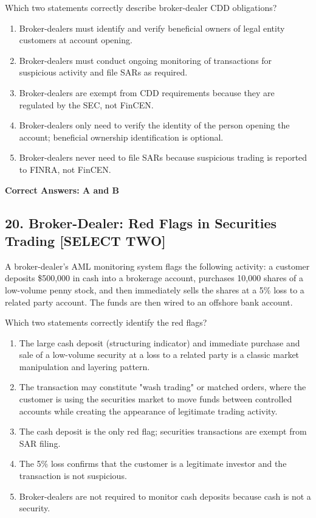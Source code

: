\documentclass[11pt,a4paper]{article}
\begin{document}
	Which two statements correctly describe broker-dealer CDD obligations?
	
	\begin{enumerate}[label=\Alph*.]
		\item Broker-dealers must identify and verify beneficial owners of legal entity customers at account opening.
		\item Broker-dealers must conduct ongoing monitoring of transactions for suspicious activity and file SARs as required.
		\item Broker-dealers are exempt from CDD requirements because they are regulated by the SEC, not FinCEN.
		\item Broker-dealers only need to verify the identity of the person opening the account; beneficial ownership identification is optional.
		\item Broker-dealers never need to file SARs because suspicious trading is reported to FINRA, not FinCEN.
	\end{enumerate}
	
	\textbf{Correct Answers: A and B}
	
	\subsection{20. Broker-Dealer: Red Flags in Securities Trading \textnormal{[SELECT TWO]}}
	
	A broker-dealer's AML monitoring system flags the following activity: a customer deposits \$500,000 in cash into a brokerage account, purchases 10,000 shares of a low-volume penny stock, and then immediately sells the shares at a 5\% loss to a related party account. The funds are then wired to an offshore bank account.
	
	Which two statements correctly identify the red flags?
	
	\begin{enumerate}[label=\Alph*.]
		\item The large cash deposit (structuring indicator) and immediate purchase and sale of a low-volume security at a loss to a related party is a classic market manipulation and layering pattern.
		\item The transaction may constitute "wash trading" or matched orders, where the customer is using the securities market to move funds between controlled accounts while creating the appearance of legitimate trading activity.
		\item The cash deposit is the only red flag; securities transactions are exempt from SAR filing.
		\item The 5\% loss confirms that the customer is a legitimate investor and the transaction is not suspicious.
		\item Broker-dealers are not required to monitor cash deposits because cash is not a security.
	\end{enumerate}
	
\end{document}
